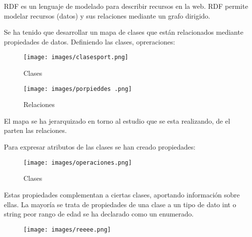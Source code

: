 \documentclass[../main.tex]{subfiles}
\begin{document}
RDF es un lenguaje de modelado para describir recursos en la web. RDF permite modelar recursos (datos) y sus relaciones mediante un grafo dirigido.

Se ha tenido que desarrollar un mapa de clases que están relacionados mediante propiedades de datos.
Definiendo las clases, opreraciones: 

\begin{figure}[ht]
    \centering
    \texttt{[image: images/clasesport.png]}
    \caption{Clases}
    \label{clasesport}
\end{figure}


\begin{figure}[h]
    \centering
    \texttt{[image: images/porpieddes .png]}
    \caption{Relaciones}
    \label{Relaciones}
\end{figure}

El mapa se ha jerarquizado en torno al estudio que se esta realizando, de el parten las relaciones.

Para expresar atributos de las clases se han creado propiedades: 
\begin{figure}[ht]
    \centering
    \texttt{[image: images/operaciones.png]}
    \caption{Clases}
    \label{operaciones}
\end{figure}
Estas propiedades complementan a ciertas clases, aportando información sobre ellas. 
La mayoría se trata de propiedades de una clase a un tipo de dato int o string peor rango de edad se ha declarado como un enumerado.

\begin{figure}[ht]
    \centering
    \texttt{[image: images/reeee.png]}
    \caption{}
    \label{reeee}
\end{figure}
\end{document}
